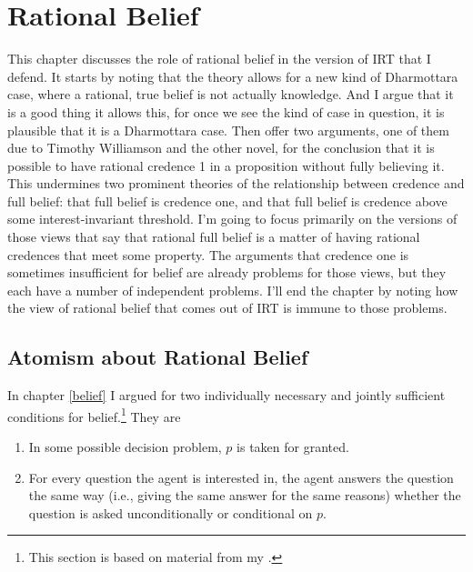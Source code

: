 \documentclass[11pt,]{book}
\providecommand{\tightlist}{%
  \setlength{\itemsep}{0pt}\setlength{\parskip}{0pt}}
\let\rmarkdownfootnote\footnote%
\def\footnote{\protect\rmarkdownfootnote}
\begin{document}
\hypertarget{ratbel}{%
\chapter{Rational Belief}\label{ratbel}}

This chapter discusses the role of rational belief in the version of IRT that I defend. It starts by noting that the theory allows for a new kind of Dharmottara case, where a rational, true belief is not actually knowledge. And I argue that it is a good thing it allows this, for once we see the kind of case in question, it is plausible that it is a Dharmottara case. Then offer two arguments, one of them due to Timothy Williamson and the other novel, for the conclusion that it is possible to have rational credence 1 in a proposition without fully believing it. This undermines two prominent theories of the relationship between credence and full belief: that full belief is credence one, and that full belief is credence above some interest-invariant threshold. I'm going to focus primarily on the versions of those views that say that rational full belief is a matter of having rational credences that meet some property. The arguments that credence one is sometimes insufficient for belief are already problems for those views, but they each have a number of independent problems. I'll end the chapter by noting how the view of rational belief that comes out of IRT is immune to those problems.

\hypertarget{atomism}{%
\section{Atomism about Rational Belief}\label{atomism}}

In chapter \ref{belief} I argued for two individually necessary and jointly sufficient conditions for belief.\footnote{This section is based on material from my \citeyearpar[sect. 3.1]{Weatherson2012}.} They are

\begin{enumerate}
\def\labelenumi{\arabic{enumi}.}
\tightlist
\item
  In some possible decision problem, \(p\) is taken for granted.
\item
  For every question the agent is interested in, the agent answers the question the same way (i.e., giving the same answer for the same reasons) whether the question is asked unconditionally or conditional on \(p\).
\end{enumerate}
\end{document}
